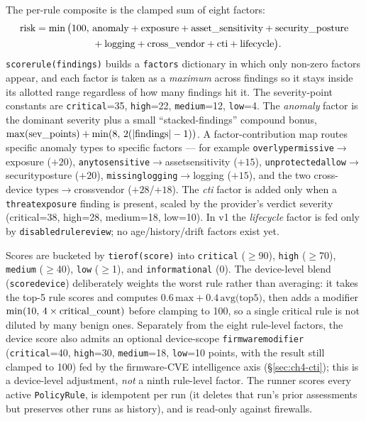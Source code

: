 \documentclass[12pt,a4paper]{report}
\renewcommand{\_}{\textunderscore\allowbreak}
\begin{document}
The per-rule composite is the clamped sum of eight factors:
\[
\begin{aligned}
\text{risk} = \min\big(100,\ &\text{anomaly} + \text{exposure} + \text{asset\_sensitivity} + \text{security\_posture} \\
&{}+ \text{logging} + \text{cross\_vendor} + \text{cti} + \text{lifecycle}\big).
\end{aligned}
\]
\texttt{score\_rule(findings)} builds a \texttt{factors} dictionary in which only non-zero factors appear, and each factor is taken as a \emph{maximum} across findings so it stays inside its allotted range regardless of how many findings hit it. The severity-point constants are \texttt{critical}=35, \texttt{high}=22, \texttt{medium}=12, \texttt{low}=4. The \emph{anomaly} factor is the dominant severity plus a small ``stacked-findings'' compound bonus, $\max(\text{sev\_points}) + \min(8,\, 2(|\text{findings}|-1))$. A factor-contribution map routes specific anomaly types to specific factors --- for example \texttt{overly\_permissive}$\rightarrow$exposure ($+20$), \texttt{any\_to\_sensitive}$\rightarrow$asset\_sensitivity ($+15$), \texttt{unprotected\_allow}$\rightarrow$security\_posture ($+20$), \texttt{missing\_logging}$\rightarrow$logging ($+15$), and the two cross-device types$\rightarrow$cross\_vendor ($+28$/$+18$). The \emph{cti} factor is added only when a \texttt{threat\_exposure} finding is present, scaled by the provider's verdict severity (critical=38, high=28, medium=18, low=10). In v1 the \emph{lifecycle} factor is fed only by \texttt{disabled\_rule\_review}; no age/history/drift factors exist yet.

Scores are bucketed by \texttt{tier\_of(score)} into \texttt{critical} ($\geq$90), \texttt{high} ($\geq$70), \texttt{medium} ($\geq$40), \texttt{low} ($\geq$1), and \texttt{informational} (0). The device-level blend (\texttt{score\_device}) deliberately weights the worst rule rather than averaging: it takes the top-5 rule scores and computes $0.6\,\text{max} + 0.4\,\text{avg(top5)}$, then adds a modifier $\min(10,\, 4\times\text{critical\_count})$ before clamping to 100, so a single critical rule is not diluted by many benign ones. Separately from the eight rule-level factors, the device score also admits an optional device-scope \texttt{firmware\_modifier} (\texttt{critical}=40, \texttt{high}=30, \texttt{medium}=18, \texttt{low}=10 points, with the result still clamped to 100) fed by the firmware-CVE intelligence axis (\S\ref{sec:ch4-cti}); this is a device-level adjustment, \emph{not} a ninth rule-level factor. The runner scores every active \texttt{PolicyRule}, is idempotent per run (it deletes that run's prior assessments but preserves other runs as history), and is read-only against firewalls.
\end{document}
